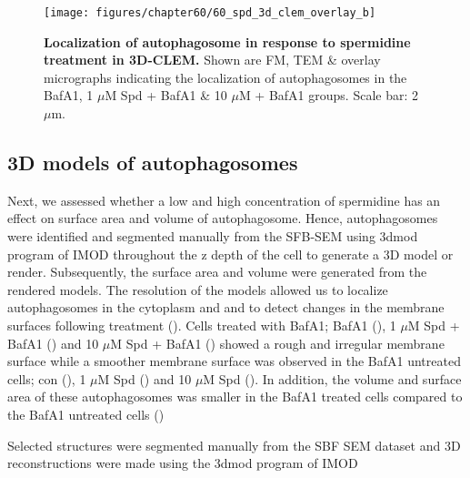 \begin{landscape}
\begin{figure}[!htbp]
\center
  \texttt{[image: figures/chapter60/60\_spd\_3d\_clem\_overlay\_b]}
  \caption[Localization of autophagosome in response to spermidine treatment in 3D-CLEM]{\textbf{Localization of autophagosome in response to spermidine treatment in 3D-CLEM.} Shown are FM, TEM \& overlay micrographs indicating the localization of autophagosomes in the BafA1, 1 $\mu$M Spd + BafA1 \& 10 $\mu$M + BafA1 groups. Scale bar: 2 $\mu$m.}
  \label{fig:60_spd_3d_clem_overlay_b}
\end{figure} 
\end{landscape}

\subsection{3D models of autophagosomes}
Next, we assessed whether a low and high concentration of spermidine has an effect on surface area and volume of autophagosome.  Hence, autophagosomes were identified and segmented manually from the SFB-SEM using 3dmod program of IMOD throughout the z depth of the cell to generate a 3D model or render. Subsequently, the surface area and volume were generated from the rendered models. The resolution of the models allowed us to localize autophagosomes in the cytoplasm and  and to detect changes in the membrane surfaces following treatment (). Cells treated with BafA1; BafA1 (), 1 $\mu$M Spd + BafA1 () and 10 $\mu$M Spd + BafA1 () showed a rough and irregular membrane surface while a smoother membrane surface was observed in the BafA1 untreated cells; con (), 1 $\mu$M Spd () and 10 $\mu$M Spd (). In addition, the volume and surface area of these autophagosomes was smaller  in the BafA1 treated cells compared to the BafA1 untreated cells ()


Selected structures were segmented manually from the SBF SEM dataset and 3D reconstructions
were made using the 3dmod program of IMOD 
